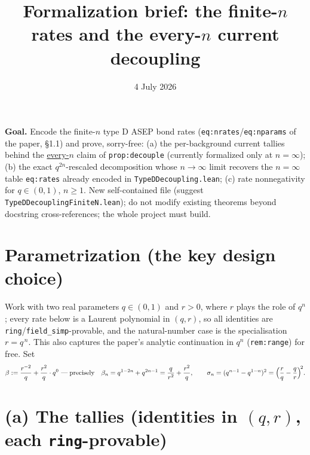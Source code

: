 \documentclass[11pt]{article}
\title{Formalization brief: the finite-$n$ rates and the every-$n$ current decoupling}
\date{4 July 2026}
\theoremstyle{plain}
\theoremstyle{remark}
\begin{document}
\maketitle

\noindent\textbf{Goal.} Encode the finite-$n$ type D ASEP bond rates
(\texttt{eq:nrates}/\texttt{eq:nparams} of the paper, \S1.1) and prove, sorry-free:
(a) the per-background current tallies behind the \underline{every-$n$} claim of
\texttt{prop:decouple} (currently formalized only at $n=\infty$); (b) the exact
$q^{2n}$-rescaled decomposition whose $n\to\infty$ limit recovers the $n=\infty$
table \texttt{eq:rates} already encoded in \texttt{TypeDDecoupling.lean}; (c) rate
nonnegativity for $q\in(0,1)$, $n\ge1$. New self-contained file (suggest
\texttt{TypeDDecouplingFiniteN.lean}); do not modify existing theorems beyond
docstring cross-references; the whole project must build.

\section*{Parametrization (the key design choice)}

Work with two real parameters $q\in(0,1)$ and $r>0$, where $r$ plays the role of
$q^{n}$; every rate below is a Laurent polynomial in $(q,r)$, so all identities are
\texttt{ring}/\texttt{field\_simp}-provable, and the natural-number case is the
specialisation $r=q^{\,n}$. This also captures the paper's analytic continuation in
$q^n$ (\texttt{rem:range}) for free. Set
\[
  \beta:=\frac{r^{-2}}{q}+\frac{r^{2}}{q}\cdot q^{0}\ \text{---\;precisely}\quad
  \beta_n=q^{1-2n}+q^{2n-1}=\frac{q}{r^2}+\frac{r^2}{q},\qquad
  \sigma_n=(q^{n-1}-q^{1-n})^2=\Big(\frac{r}{q}-\frac{q}{r}\Big)^{\!2}.
\]

\section*{(a) The tallies (identities in $(q,r)$, each \texttt{ring}-provable)}
\end{document}
